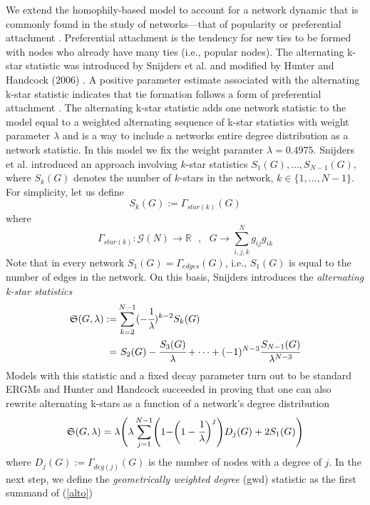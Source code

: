 \documentclass[10pt, conference, compsocconf]{IEEEtran}
\begin{document}
We extend the homophily-based model to account for a network dynamic that is commonly found in the study of networks---that of popularity or preferential attachment \cite{barabasi1999emergence}. Preferential attachment is the tendency for new ties to be formed with nodes who already have many ties (i.e., popular nodes).  The alternating k-star statistic was introduced by Snijders et al. \cite{SnijdersTomA.B..2006} and modified by Hunter and Handcock (2006) \cite{Hunter.2006}. A positive parameter estimate associated with the alternating k-star statistic indicates that tie formation follows a form of preferential attachment \cite{SnijdersTomA.B..2006}. The alternating k-star statistic adds one network statistic to the model equal to a weighted alternating sequence of k-star statistics with weight parameter $\lambda$ and is a way to include a networks entire degree distribution as a network statistic. In this model we fix the weight paramter $\lambda=0.4975$. 
Snijders et al. \cite{SnijdersTomA.B..2006} introduced an approach involving $k$-star statistics $S_1(G), \dots , S_{N-1}(G)$, where $S_k(G)$ denotes the number of $k$-stars in the network, $k \in \{1, \dots , N-1\}$. For simplicity, let us define
$$S_k(G):=\Gamma_{star(k)}(G) $$
where
$$\Gamma_{star(k)}: \mathcal{G}(N) \to \mathbb{R}~~~, ~~~ G \to \sum_{i,j,k}^N g_{ij}g_{ik}$$
Note that in every network $S_1(G)=\Gamma_{edges}(G)$, i.e., $S_1(G)$ is equal to the number of edges in the network.
On this basis, Snijders introduces the \textit{alternating k-star statistics}
\begin{equation*}
\begin{split}
\mathfrak{S}(G,\lambda):= & \sum_{k=2}^{N-1}(-\cfrac{1}{\lambda})^{k-2}S_k(G)\\= & ~   S_2(G)-\cfrac{S_3(G)}{\lambda}+ \dots + (-1)^{N-3}\cfrac{S_{N-1}(G)}{\lambda^{N-3}}
\end{split}
\end{equation*} 
Models with this statistic and a fixed decay parameter turn out to be standard ERGMs and Hunter and Handcock \cite{Hunter.2006} succeeded in proving that one can also rewrite alternating k-stars as a function of a network's degree distribution
\begin{equation}
\mathfrak{S}(G,\lambda)= \lambda\Biggr(\lambda\sum_{j=1}^{N-1}\Biggr( 1-\biggr(1-\cfrac{1}{\lambda}\biggl)^j\Biggl)D_j(G) + 2S_1(G)\Biggl)
\label{alto}
\end{equation}
where $D_j(G):= \Gamma_{deg(j)}(G)$ is the number of nodes with a degree of $j$. 
In the next step, we define the \textit{geometrically weighted degree} (gwd) statistic as the first summand of (\ref{alto})
\end{document}
